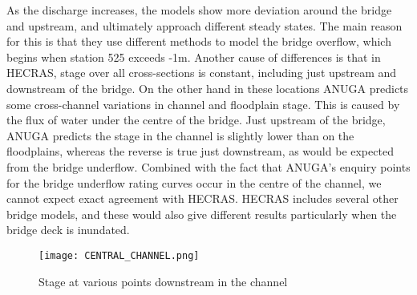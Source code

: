 As the discharge increases, the models show more deviation around the
bridge and upstream, and ultimately approach different steady states. The main
reason for this is that they use different methods to model the bridge
overflow, which begins when station 525 exceeds -1m. Another cause of
differences is that in HECRAS, stage over all cross-sections is constant,
including just upstream and downstream of the bridge. On the other hand in
these locations ANUGA predicts some cross-channel variations in channel and
floodplain stage. This is caused by the flux of water under the centre of the
bridge. Just upstream of the bridge, ANUGA predicts the stage in the channel is
slightly lower than on the floodplains, whereas the reverse is true just
downstream, as would be expected from the bridge underflow. Combined with the
fact that ANUGA's enquiry points for the bridge underflow rating curves occur
in the centre of the channel, we cannot expect exact agreement with HECRAS.
HECRAS includes several other bridge models, and these would also give
different results particularly when the bridge deck is inundated. 

\begin{figure}
\begin{center}
\texttt{[image: CENTRAL\_CHANNEL.png]}
\end{center}
\caption{Stage at various points downstream in the channel}
\label{Reach}
\end{figure}


